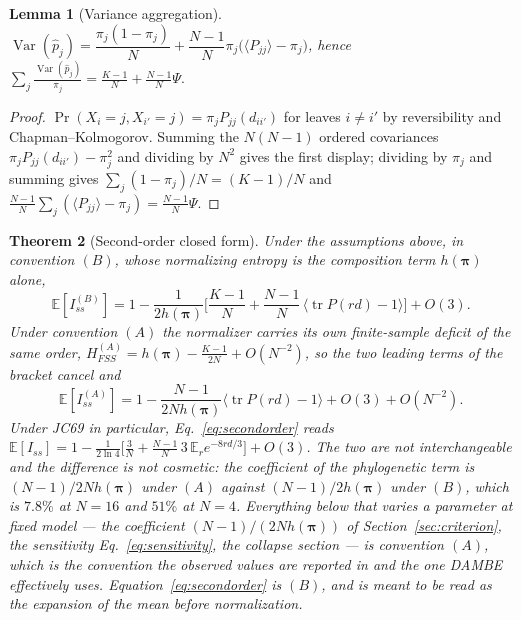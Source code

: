 \documentclass[preprint,12pt,authoryear]{elsarticle}
\newcommand{\Iss}{I_{ss}}
\newcommand{\HFSS}{H_{FSS}}
\newcommand{\bpi}{\boldsymbol{\pi}}
\newcommand{\tr}{\operatorname{tr}}
\newcommand{\E}{\mathbb{E}}
\newcommand{\Var}{\operatorname{Var}}
\newtheorem{theorem}{Theorem}
\newtheorem{lemma}[theorem]{Lemma}
\theoremstyle{definition}
\theoremstyle{remark}
\begin{document}
\begin{lemma}[Variance aggregation]
\label{lem:varagg}
$\Var(\hat p_j)=\dfrac{\pi_j(1-\pi_j)}{N}+\dfrac{N-1}{N}\pi_j
\bigl(\langle P_{jj}\rangle-\pi_j\bigr)$, hence
$\displaystyle\sum_j\frac{\Var(\hat p_j)}{\pi_j}
=\frac{K-1}{N}+\frac{N-1}{N}\Psi .$
\end{lemma}

\begin{proof}
$\Pr(X_i=j,X_{i'}=j)=\pi_jP_{jj}(d_{ii'})$ for leaves $i\ne i'$ by
reversibility and Chapman--Kolmogorov. Summing the $N(N-1)$ ordered
covariances $\pi_jP_{jj}(d_{ii'})-\pi_j^2$ and dividing by $N^2$ gives the
first display; dividing by $\pi_j$ and summing gives
$\sum_j(1-\pi_j)/N=(K-1)/N$ and
$\frac{N-1}{N}\sum_j(\langle P_{jj}\rangle-\pi_j)=\frac{N-1}{N}\Psi$.
\end{proof}

\begin{theorem}[Second-order closed form]
\label{thm:secondorder}
Under the assumptions above, in convention $(B)$, whose normalizing entropy
is the composition term $h(\bpi)$ alone,
\begin{equation}
  \E[\Iss^{(B)}]=1-\frac{1}{2h(\bpi)}\biggl[\frac{K-1}{N}
  +\frac{N-1}{N}\,\bigl\langle\tr P(rd)-1\bigr\rangle\biggr]+O(3).
  \label{eq:secondorder}
\end{equation}
Under convention $(A)$ the normalizer carries its own finite-sample deficit
of the same order, $\HFSS^{(A)}=h(\bpi)-\frac{K-1}{2N}+O(N^{-2})$, so the two
leading terms of the bracket cancel and
\begin{equation}
  \E[\Iss^{(A)}]=1-\frac{N-1}{2Nh(\bpi)}\bigl\langle\tr P(rd)-1\bigr\rangle
  +O(3)+O(N^{-2}).
  \label{eq:secondorderA}
\end{equation}
Under JC69 in particular, Eq.~\eqref{eq:secondorder} reads
$\E[\Iss]=1-\frac{1}{2\ln4}\bigl[\frac3N+\frac{N-1}{N}\,3\,\E_r e^{-8rd/3}\bigr]+O(3)$.
The two are not interchangeable and the difference is not cosmetic: the
coefficient of the phylogenetic term is $(N-1)/2Nh(\bpi)$ under $(A)$ against
$(N-1)/2h(\bpi)$ under $(B)$, which is $7.8\%$ at $N=16$ and $51\%$ at $N=4$.
Everything below that varies a parameter at fixed model --- the coefficient
$(N-1)/(2Nh(\bpi))$ of Section~\ref{sec:criterion}, the sensitivity
Eq.~\eqref{eq:sensitivity}, the collapse section --- is convention $(A)$,
which is the convention the observed values are reported in and the one
DAMBE effectively uses. Equation~\eqref{eq:secondorder} is $(B)$, and is
meant to be read as the expansion of the mean before normalization.
\end{theorem}
\end{document}
